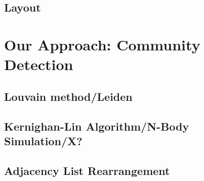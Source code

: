     \subsection{Layout}\label{\positionnumber}

\section{Our Approach: Community Detection}\label{\positionnumber}
    \subsection{Louvain method/Leiden}\label{\positionnumber}
    \subsection{Kernighan-Lin Algorithm/N-Body Simulation/X?}\label{\positionnumber}
    \subsection{Adjacency List Rearrangement}\label{\positionnumber}

